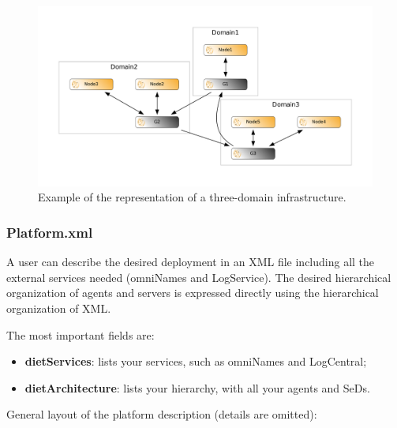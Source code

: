 \begin{figure}[h]
  \centering
  \includegraphics[width=15cm]{fig/godiet-infrastructure}
  \caption{Example of the representation of a three-domain infrastructure.\label{fig:GODIETInfrastructure}}
\end{figure}

\subsubsection{Platform.xml}
\label{GODIETPlatform}

A \godiet user can describe the desired deployment in an XML file including all the external services needed (\eg omniNames and LogService). The desired hierarchical organization of agents and servers is expressed directly using the hierarchical organization of XML. 


The most important fields are:
\begin{itemize}
\item \textbf{dietServices}: lists your \diet services, such as omniNames and LogCentral;
\item \textbf{dietArchitecture}: lists your \diet hierarchy, with all your agents and SeDs. 
\end{itemize}

\vspace{1cm}

General layout of the \diet platform description (details are omitted):


